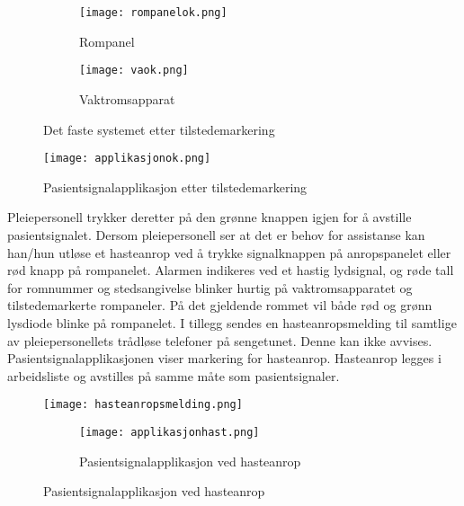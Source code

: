 \begin{figure}[H]
        \centering
        \begin{subfigure}[b]{0.35\textwidth}
        		\centering
                \texttt{[image: rompanelok.png]}
                \caption{Rompanel}
                \label{rompanelok}
        \end{subfigure}
        \begin{subfigure}[b]{0.25\textwidth}
        		\centering
                \texttt{[image: vaok.png]}
                \caption{Vaktromsapparat}
                \label{vaok}
        \end{subfigure}
        \caption{Det faste systemet etter tilstedemarkering}
\end{figure} 
 \begin{figure}[H]
\centering
\texttt{[image: applikasjonok.png]}
\caption{Pasientsignalapplikasjon etter tilstedemarkering}
\label{applikasjonok}
\end{figure}
\noindent
Pleiepersonell trykker deretter på den grønne knappen igjen for å avstille pasientsignalet. Dersom pleiepersonell ser at det er behov for assistanse kan han/hun utløse et hasteanrop ved å trykke signalknappen på anropspanelet eller rød knapp på rompanelet. Alarmen indikeres ved et hastig lydsignal, og røde tall for romnummer og stedsangivelse blinker hurtig på vaktromsapparatet og tilstedemarkerte rompaneler. På det gjeldende rommet vil både rød og grønn lysdiode blinke på rompanelet. I tillegg sendes en hasteanropsmelding til samtlige av pleiepersonellets trådløse telefoner på sengetunet. Denne kan ikke avvises. Pasientsignalapplikasjonen viser markering for hasteanrop.
Hasteanrop legges i arbeidsliste og avstilles på samme måte som pasientsignaler.
\begin{figure}[H]
\centering
\texttt{[image: hasteanropsmelding.png]}
\caption{Trådløs telefonenhet ved hasteanrop}

\begin{figure}[H]
\centering
\texttt{[image: applikasjonhast.png]}
\caption{Pasientsignalapplikasjon ved hasteanrop}
\label{applikasjonok}
\end{figure}
\label{applikasjonok}
\end{figure}










